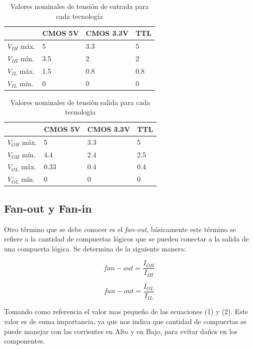 \documentclass[journal]{IEEEtran}
\begin{document}
	\begin{table}[htb]
		\centering
		\begin{tabular}{llll}
			\hline
			& CMOS 5V & CMOS 3.3V & TTL \\
			\hline
			$V_{IH}$ máx. &  5      & 3.3        & 5 \\
			$V_{IH}$ mín. &  3.5    & 2          & 2 \\
			$V_{IL}$ máx. &  1.5    & 0.8        & 0.8 \\
			$V_{IL}$ mín. &  0      & 0          & 0 \\
		\end{tabular}
		\caption{Valores nominales de tensión de entrada para cada tecnología}
		\label{tab:VInput}
	\end{table}
	
	\begin{table}[htb]
		\centering
		\begin{tabular}{llll}
			\hline
			& CMOS 5V & CMOS 3.3V & TTL \\
			\hline
			$V_{OH}$ máx. &  5      & 3.3        & 5 \\
			$V_{OH}$ mín. &  4.4    & 2.4        & 2.5 \\
			$V_{OL}$ máx. &  0.33   & 0.4        & 0.4 \\
			$V_{OL}$ mín. &  0      & 0          & 0 \\
		\end{tabular}
		\caption{Valores nominales de tensión salida para cada tecnología}
		\label{tab:VOutput}
	\end{table}
	
	\subsection{Fan-out y Fan-in}
	Otro término que se debe conocer es el \textsl{fan-out}, básicamente este término se refiere a la cantidad de compuertas lógicos que se pueden conectar a la salida de una compuerta lógica. Se determina de la siguiente manera: 
	
	\begin{equation}
		fan-out=\frac{I_{OH}}{I_{IH}}
	\end{equation}
	
	\begin{equation}
		fan-out=\frac{I_{OL}}{I_{IL}}
	\end{equation}
	
	Tomando como referencia el valor mas pequeño de las ecuaciones (1) y (2). Este valor es de suma importancia, ya que nos indica que cantidad de compuertas se puede manejar con las corrientes en Alto y en Bajo, para evitar daños en los componentes. 
	
\end{document}
